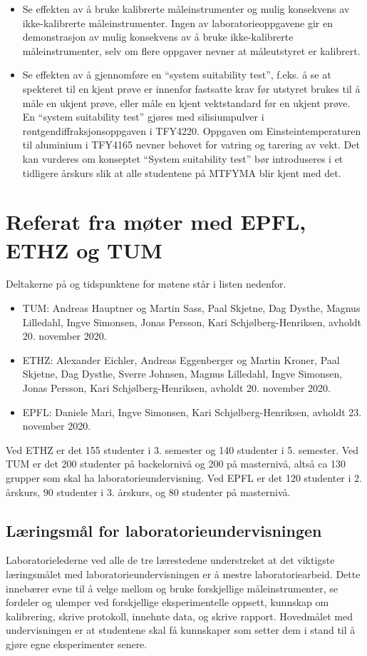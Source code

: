 \documentclass{article}
\begin{document}
\begin{itemize}
  \item Se effekten av å bruke kalibrerte måleinstrumenter og mulig konsekvens av ikke-kalibrerte måleinstrumenter. Ingen av laboratorieoppgavene gir en demonstrasjon av mulig konsekvens av å bruke ikke-kalibrerte måleinstrumenter, selv om flere oppgaver nevner at måleutstyret er kalibrert.
  \item Se effekten av å gjennomføre en ``system suitability test'', f.eks. å se at spekteret til en kjent prøve er innenfor fastsatte krav før utstyret brukes til å måle en ukjent prøve, eller måle en kjent vektstandard før en ukjent prøve.  En ``system suitability test'' gjøres med silisiumpulver i røntgendiffraksjonsoppgaven i TFY4220. Oppgaven om Einsteintemperaturen til aluminium i TFY4165 nevner behovet for vatring og tarering av vekt. Det kan vurderes om konseptet ``System suitability test'' bør introduseres i et tidligere årskurs slik at alle studentene på MTFYMA blir kjent med det.
\end{itemize}
\appendix
\section{Referat fra møter med EPFL, ETHZ og TUM}\label{Referat}

Deltakerne på og tidspunktene for møtene står i listen nedenfor.
\begin{itemize}
  \item TUM: Andreas Hauptner og Martin Sass, Paal Skjetne, Dag Dysthe, Magnus Lilledahl, Ingve Simonsen, Jonas Persson, Kari Schjølberg-Henriksen, avholdt 20. november 2020. 
  \item ETHZ: Alexander Eichler, Andreas Eggenberger og Martin Kroner, Paal Skjetne, Dag Dysthe, Sverre Johnsen, Magnus Lilledahl, Ingve Simonsen, Jonas Persson, Kari Schjølberg-Henriksen, avholdt 20. november 2020. 
  \item EPFL: Daniele Mari, Ingve Simonsen, Kari Schjølberg-Henriksen, avholdt 23. november 2020. 
\end{itemize}

Ved ETHZ er det 155 studenter i 3. semester og 140 studenter i 5. semester. Ved TUM er det 200 studenter på backelornivå og 200 på masternivå, altså ca 130 grupper som skal ha laboratorieundervisning. Ved EPFL er det 120 studenter i 2. årskurs, 90 studenter i 3. årskurs, og 80 studenter på masternivå. 

\subsection{Læringsmål for laboratorieundervisningen}
Laboratorielederne ved alle de tre lærestedene understreket at det viktigste læringsmålet med laboratorieundervisningen er å mestre laboratoriearbeid. Dette innebærer evne til å velge mellom og bruke forskjellige måleinstrumenter, se fordeler og ulemper ved forskjellige eksperimentelle oppsett, kunnskap om kalibrering, skrive protokoll, innehnte data, og skrive rapport. Hovedmålet med undervisningen er at studentene skal få kunnskaper som setter dem i stand til å gjøre egne eksperimenter senere. 
\end{document}
